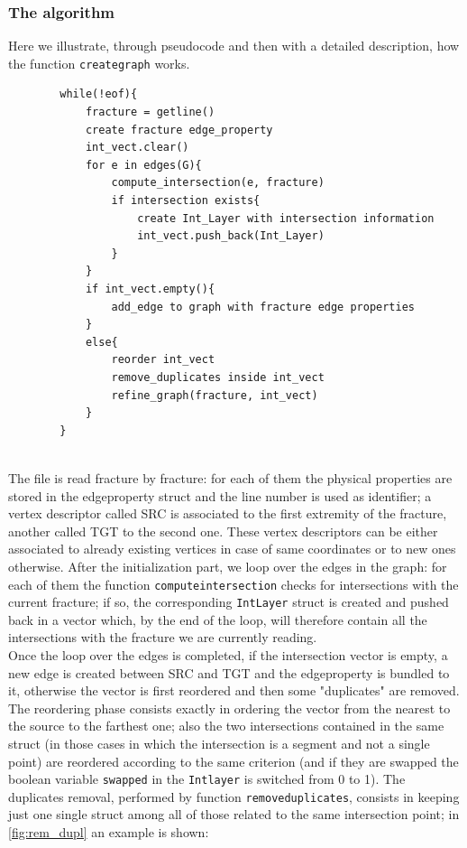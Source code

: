 \documentclass[11pt]{article} %
\begin{document}
		\subsubsection{The algorithm}
		Here we illustrate, through pseudocode and then with a detailed description, how the function \texttt{create\textunderscore graph} works.
		\begin{lstlisting}
		while(!eof){
			fracture = getline()
			create fracture edge_property 
			int_vect.clear()
			for e in edges(G){
				compute_intersection(e, fracture)
				if intersection exists{
					create Int_Layer with intersection information
					int_vect.push_back(Int_Layer)
				}	
			}
			if int_vect.empty(){
				add_edge to graph with fracture edge properties
			}
			else{
				reorder int_vect
				remove_duplicates inside int_vect
				refine_graph(fracture, int_vect)  
			}
		}		
		
		\end{lstlisting}
		The file is read fracture by fracture: for each of them the physical properties are stored in the edge\textunderscore property struct and the line number is used as identifier; a vertex descriptor called SRC is associated to the first extremity of the fracture, another called TGT to the second one. These vertex descriptors can be either associated to already existing vertices in case of same coordinates or to new ones otherwise. After the initialization part, we loop over the edges in the graph: for each of them the function \texttt{compute\textunderscore intersection} checks for intersections with the current fracture; if so, the corresponding \texttt{Int\textunderscore Layer} struct is created and pushed back in a vector which, by the end of the loop, will therefore contain all the intersections with the fracture we are currently reading. \\
		Once the loop over the edges is completed, if the intersection vector is empty, a new edge is created between SRC and TGT and the edge\textunderscore property is bundled to it, otherwise the vector is first reordered and then some "duplicates" are removed.
		The reordering phase consists exactly in ordering the vector from the nearest to the source to the farthest one; also the two intersections contained in the same struct (in those cases in which the intersection is a segment and not a single point) are reordered according to the same criterion (and if they are swapped the boolean variable \texttt{swapped} in the \texttt{Int\textunderscore layer} is switched from 0 to 1).
		The duplicates removal, performed by function \texttt{remove\textunderscore duplicates}, consists in keeping just one single struct among all of those related to the same intersection point; in \ref{fig:rem_dupl} an example is shown: 
\end{document}
